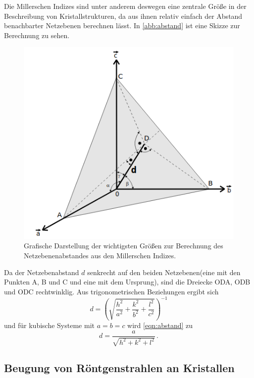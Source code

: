 Die Millerschen Indizes sind unter anderem deswegen eine zentrale Größe in der Beschreibung
von Kristallstrukturen, da aus ihnen relativ einfach der Abstand benachbarter Netzebenen
berechnen lässt. In \autoref{abb:abstand} ist eine Skizze zur Berechnung zu sehen.
\begin{figure}
  \centering
  \includegraphics[scale=0.5]{content/pics/netzebenenabstand.png}
  \caption{Grafische Darstellung der wichtigsten Größen zur Berechnung des Netzebenenabstandes
  aus den Millerschen Indizes. \cite{anleitung}}
  \label{abb:abstand}
\end{figure}
Da der Netzebenabstand $d$ senkrecht auf den beiden Netzebenen(eine mit den Punkten
A, B und C und eine mit dem Ursprung), sind die Dreiecke ODA, ODB und ODC rechtwinklig.
Aus trigonometrischen Beziehungen ergibt sich
\begin{equation}
  d = \left(\sqrt{\frac{h^2}{a^2} + \frac{k^2}{b^2} + \frac{l^2}{c^2}}\right)^{-1}
  \label{eqn:abstand}
\end{equation}
und für kubische Systeme mit $a = b = c$ wird \eqref{eqn:abstand} zu
\begin{equation}
  d = \frac{a}{\sqrt{h^2 + k^2 + l^2}} \, .
  \label{eqn:abstand_kubisch}
\end{equation}
\pagebreak
\subsection{Beugung von Röntgenstrahlen an Kristallen}

